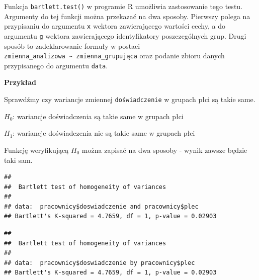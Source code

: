 \documentclass[]{book}
\newenvironment{Shaded}{\begin{snugshade}}{\end{snugshade}}
\newcommand{\DataTypeTok}[1]{\textcolor[rgb]{0.13,0.29,0.53}{#1}}
\newcommand{\KeywordTok}[1]{\textcolor[rgb]{0.13,0.29,0.53}{\textbf{#1}}}
\newcommand{\NormalTok}[1]{#1}
\newcommand{\OperatorTok}[1]{\textcolor[rgb]{0.81,0.36,0.00}{\textbf{#1}}}
\newcommand{\StringTok}[1]{\textcolor[rgb]{0.31,0.60,0.02}{#1}}
\begin{document}
Funkcja \texttt{bartlett.test()} w programie R umożliwia zastosowanie tego testu. Argumenty do tej funkcji można przekazać na dwa sposoby. Pierwszy polega na przypisaniu do argumentu \texttt{x} wektora zawierającego wartości cechy, a do argumentu \texttt{g} wektora zawierającego identyfikatory poszczególnych grup. Drugi sposób to zadeklarowanie formuły w postaci \texttt{zmienna\_analizowa\ \textasciitilde{}\ zmienna\_grupująca} oraz podanie zbioru danych przypisanego do argumentu \texttt{data}.

\textbf{Przykład}

Sprawdźmy czy wariancje zmiennej \texttt{doświadczenie} w grupach płci są takie same.

\(H_0\): wariancje doświadczenia są takie same w grupach płci

\(H_1\): wariancje doświadczenia nie są takie same w grupach płci

Funkcję weryfikującą \(H_0\) można zapisać na dwa sposoby - wynik zawsze będzie taki sam.

\begin{Shaded}
\end{Shaded}

\begin{verbatim}
## 
##  Bartlett test of homogeneity of variances
## 
## data:  pracownicy$doswiadczenie and pracownicy$plec
## Bartlett's K-squared = 4.7659, df = 1, p-value = 0.02903
\end{verbatim}

\begin{Shaded}
\end{Shaded}

\begin{verbatim}
## 
##  Bartlett test of homogeneity of variances
## 
## data:  pracownicy$doswiadczenie by pracownicy$plec
## Bartlett's K-squared = 4.7659, df = 1, p-value = 0.02903
\end{verbatim}
\end{document}
